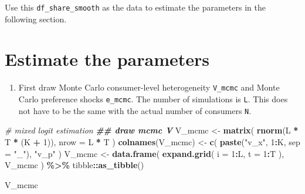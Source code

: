 \documentclass[
]{book}
\newenvironment{Shaded}{\begin{snugshade}}{\end{snugshade}}
\newcommand{\AttributeTok}[1]{\textcolor[rgb]{0.13,0.29,0.53}{#1}}
\newcommand{\CommentTok}[1]{\textcolor[rgb]{0.56,0.35,0.01}{\textit{#1}}}
\newcommand{\DecValTok}[1]{\textcolor[rgb]{0.00,0.00,0.81}{#1}}
\newcommand{\DocumentationTok}[1]{\textcolor[rgb]{0.56,0.35,0.01}{\textbf{\textit{#1}}}}
\newcommand{\FunctionTok}[1]{\textcolor[rgb]{0.13,0.29,0.53}{\textbf{#1}}}
\newcommand{\NormalTok}[1]{#1}
\newcommand{\OtherTok}[1]{\textcolor[rgb]{0.56,0.35,0.01}{#1}}
\newcommand{\SpecialCharTok}[1]{\textcolor[rgb]{0.81,0.36,0.00}{\textbf{#1}}}
\newcommand{\StringTok}[1]{\textcolor[rgb]{0.31,0.60,0.02}{#1}}
\providecommand{\tightlist}{%
  \setlength{\itemsep}{0pt}\setlength{\parskip}{0pt}}
\begin{document}
Use this \texttt{df\_share\_smooth} as the data to estimate the parameters in the following section.

\hypertarget{estimate-the-parameters-2}{%
\section{Estimate the parameters}\label{estimate-the-parameters-2}}

\begin{enumerate}
\def\labelenumi{\arabic{enumi}.}
\tightlist
\item
  First draw Monte Carlo consumer-level heterogeneity \texttt{V\_mcmc} and Monte Carlo preference shocks \texttt{e\_mcmc}. The number of simulations is \texttt{L}. This does not have to be the same with the actual number of consumers \texttt{N}.
\end{enumerate}

\begin{Shaded}
\begin{Highlighting}[]
\CommentTok{\# mixed logit estimation}
\DocumentationTok{\#\# draw mcmc V}
\NormalTok{V\_mcmc }\OtherTok{\textless{}{-}} 
  \FunctionTok{matrix}\NormalTok{(}
    \FunctionTok{rnorm}\NormalTok{(L }\SpecialCharTok{*}\NormalTok{ T }\SpecialCharTok{*}\NormalTok{ (K }\SpecialCharTok{+} \DecValTok{1}\NormalTok{)), }
    \AttributeTok{nrow =}\NormalTok{ L }\SpecialCharTok{*}\NormalTok{ T}
\NormalTok{    ) }
\FunctionTok{colnames}\NormalTok{(V\_mcmc) }\OtherTok{\textless{}{-}} 
  \FunctionTok{c}\NormalTok{(}
    \FunctionTok{paste}\NormalTok{(}\StringTok{"v\_x"}\NormalTok{, }\DecValTok{1}\SpecialCharTok{:}\NormalTok{K, }\AttributeTok{sep =} \StringTok{"\_"}\NormalTok{), }
    \StringTok{"v\_p"}
\NormalTok{    )}
\NormalTok{V\_mcmc }\OtherTok{\textless{}{-}} 
  \FunctionTok{data.frame}\NormalTok{(}
  \FunctionTok{expand.grid}\NormalTok{(}
    \AttributeTok{i =} \DecValTok{1}\SpecialCharTok{:}\NormalTok{L, }
    \AttributeTok{t =} \DecValTok{1}\SpecialCharTok{:}\NormalTok{T}
\NormalTok{    ),}
\NormalTok{  V\_mcmc}
\NormalTok{  ) }\SpecialCharTok{\%\textgreater{}\%}
\NormalTok{  tibble}\SpecialCharTok{::}\FunctionTok{as\_tibble}\NormalTok{() }
\end{Highlighting}
\end{Shaded}

\begin{Shaded}
\begin{Highlighting}[]
\NormalTok{V\_mcmc}
\end{Highlighting}
\end{Shaded}
\end{document}
